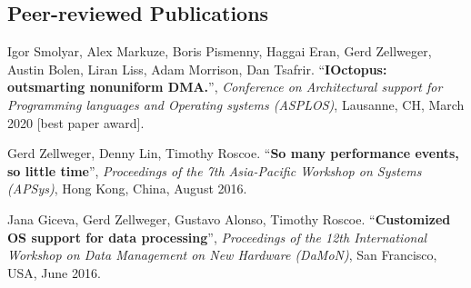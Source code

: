 \documentclass[margin,line]{resume}
\begin{document}
\begin{resume}



    \pagebreak

    \section{\mysidestyle Peer-reviewed Publications}

    Igor Smolyar, Alex Markuze, Boris Pismenny, Haggai Eran, Gerd Zellweger, Austin Bolen, Liran Liss, Adam Morrison, Dan Tsafrir.
    ``\textbf{IOctopus: outsmarting nonuniform DMA.}'', \textsl{Conference on Architectural support for Programming languages and Operating systems (ASPLOS)}, Lausanne, CH, March 2020 [best paper award].

    Gerd Zellweger, Denny Lin, Timothy Roscoe.
    ``\textbf{So many performance events, so little time}'', \textsl{Proceedings of the 7th Asia-Pacific Workshop on Systems (APSys)}, Hong Kong, China, August 2016.

    Jana Giceva, Gerd Zellweger, Gustavo Alonso, Timothy Roscoe.
    ``\textbf{Customized OS support for data processing}'',
    \textsl{Proceedings of the 12th International Workshop on Data Management on New Hardware (DaMoN)}, San Francisco, USA, June 2016.


\end{resume}
\end{document}
